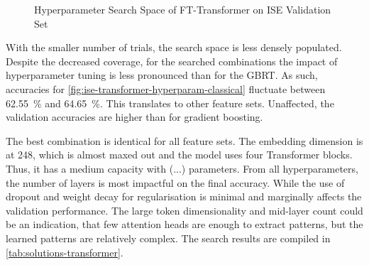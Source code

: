 \begin{figure}[!h]
\end{figure}
\clearpage
\begin{figure}[!ht]
    \addtocounter{figure}{-1}
    \vfill
    \caption[Hyperparameter Search Space of FT-Transformer on  Validation Set]{Hyperparameter Search Space of FT-Transformer on \gls{ISE} Validation Set}
    \label{fig:ise-transformer-hyperparam}
\end{figure}

With the smaller number of trials, the search space is less densely populated. Despite the decreased coverage, for the searched combinations the impact of hyperparameter tuning is less pronounced than for the \gls{GBRT}. As such, accuracies for \cref{fig:ise-transformer-hyperparam-classical} fluctuate between \SI{62.55}{\percent} and \SI{64.65}{\percent}. This translates to other feature sets. Unaffected, the validation accuracies are higher than for gradient boosting.


The best combination is identical for all feature sets. The embedding dimension is at \num{248}, which is almost maxed out and the model uses four Transformer blocks. Thus, it has a medium capacity with (...) parameters. From all hyperparameters, the number of layers is most impactful on the final accuracy.
While the use of dropout and weight decay for regularisation is minimal and marginally affects the validation performance. The large token dimensionality and mid-layer count could be an indication, that few attention heads are enough to extract patterns, but the learned patterns are relatively complex. The search results are compiled in \cref{tab:solutions-transformer}.

